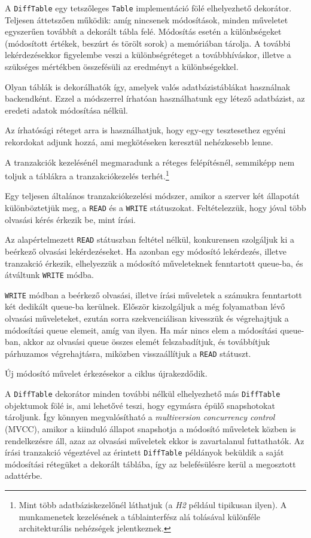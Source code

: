 \documentclass[
    parspace,
    noindent,
    nohyp,
]{elteiktdk}[2023/04/10]
\begin{document}
A \texttt{DiffTable} egy tetszőleges \texttt{Table} implementáció fölé elhelyezhető dekorátor.
Teljesen áttetszően működik: amíg nincsenek módosítások,
minden műveletet egyszerűen továbbít a dekorált tábla felé.
Módosítás esetén a különbségeket (módosított értékek, beszúrt és törölt sorok) a memóriában tárolja.
A további lekérdezésekkor figyelembe veszi a különbségréteget a továbbhíváskor,
illetve a szükséges mértékben összefésüli az eredményt a különbségekkel.

Olyan táblák is dekorálhatók így, amelyek valós adatbázistáblákat használnak backendként.
Ezzel a módszerrel írhatóan használhatunk egy létező adatbázist,
az eredeti adatok módosítása nélkül.

Az írhatósági réteget arra is használhatjuk,
hogy egy-egy tesztesethez egyéni rekordokat adjunk hozzá,
ami megkötéseken keresztül nehézkesebb lenne.

A tranzakciók kezelésénél megmaradunk a réteges felépítésnél,
semmiképp nem toljuk a táblákra a tranzakciókezelés terhét.\footnote{
    Mint több adatbáziskezelőnél láthatjuk (a \textit{H2} például tipikusan ilyen).
    A munkamenetek kezelésének a táblainterfész alá tolásával
    különféle architekturális nehézségek jelentkeznek.
}

Egy teljesen általános tranzakciókezelési módszer,
amikor a szerver két állapotát különböztetjük meg,
a \texttt{READ} és a \texttt{WRITE} státuszokat.
Feltételezzük, hogy jóval több olvasási kérés érkezik be, mint írási.

Az alapértelmezett \texttt{READ} státuszban feltétel nélkül,
konkurensen szolgáljuk ki a beérkező olvasási lekérdezéseket.
Ha azonban egy módosító lekérdezés, illetve tranzakció érkezik,
elhelyezzük a módosító műveleteknek fenntartott queue-ba,
és átváltunk \texttt{WRITE} módba.

\texttt{WRITE} módban a beérkező olvasási, illetve írási műveletek
a számukra fenntartott két dedikált queue-ba kerülnek.
Először kiszolgáljuk a még folyamatban lévő olvasási műveleteket,
ezután sorra szekvenciálisan kivesszük és végrehajtjuk a módosítási queue elemeit, amíg van ilyen.
Ha már nincs elem a módosítási queue-ban,
akkor az olvasási queue összes elemét felszabadítjuk, és továbbítjuk párhuzamos végrehajtásra,
miközben visszaállítjuk a \texttt{READ} státuszt.

Új módosító művelet érkezésekor a ciklus újrakezdődik.

A \texttt{DiffTable} dekorátor minden további nélkül elhelyezhető
más \texttt{DiffTable} objektumok fölé is, ami lehetővé teszi, hogy egymásra épülő snapshotokat tároljunk.
Így könnyen megvalósítható a \textit{multiversion concurrency control} (MVCC),
amikor a kiinduló állapot snapshotja a módosító műveletek közben is rendelkezésre áll,
azaz az olvasási műveletek ekkor is zavartalanul futtathatók.
Az írási tranzakció végeztével az érintett \texttt{DiffTable} példányok
beküldik a saját módosítási rétegüket a dekorált táblába,
így az belefésülésre kerül a megosztott adattérbe.
\end{document}
